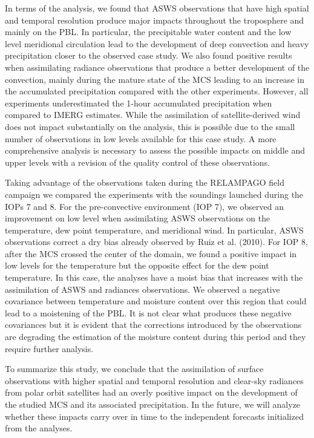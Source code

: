 \documentclass[final,5p,times,twocolumn,authoryear]{elsarticle} %
\begin{document}
In terms of the analysis, we found that ASWS observations that have high spatial and temporal resolution produce major impacts throughout the troposphere and mainly on the PBL. In particular, the precipitable water content and the low level meridional circulation lead to the development of deep convection and heavy precipitation closer to the observed case study. We also found positive results when assimilating radiance observations that produce a better development of the convection, mainly during the mature state of the MCS leading to an increase in the accumulated precipitation compared with the other experiments. However, all experiments underestimated the 1-hour accumulated precipitation when compared to IMERG estimates. While the assimilation of satellite-derived wind does not impact substantially on the analysis, this is possible due to the small number of observations in low levels available for this case study. A more comprehensive analysis is necessary to assess the possible impacts on middle and upper levels with a revision of the quality control of these observations.

Taking advantage of the observations taken during the RELAMPAGO field campaign we compared the experiments with the soundings launched during the IOPs 7 and 8. For the pre-convective environment (IOP 7), we observed an improvement on low level when assimilating ASWS observations on the temperature, dew point temperature, and meridional wind. In particular, ASWS observations correct a dry bias already observed by Ruiz et al. (2010). For IOP 8, after the MCS crossed the center of the domain, we found a positive impact in low levels for the temperature but the opposite effect for the dew point temperature. In this case, the analyses have a moist bias that increases with the assimilation of ASWS and radiances observations. We observed a negative covariance between temperature and moisture content over this region that could lead to a moistening of the PBL. It is not clear what produces these negative covariances but it is evident that the corrections introduced by the observations are degrading the estimation of the moisture content during this period and they require further analysis.

To summarize this study, we conclude that the assimilation of surface observations with higher spatial and temporal resolution and clear-sky radiances from polar orbit satellites had an overly positive impact on the development of the studied MCS and its associated precipitation. In the future, we will analyze whether these impacts carry over in time to the independent forecasts initialized from the analyses.
\end{document}
